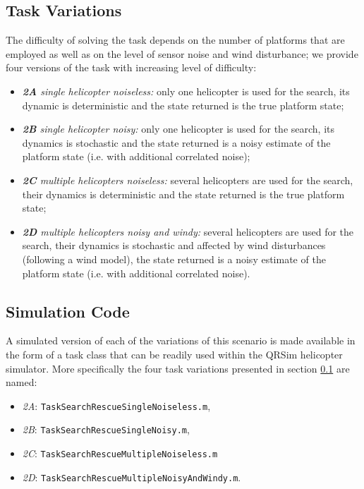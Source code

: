 \documentclass[a4paper,11pt]{report}
\newcommand{\sname}{QRSim\xspace}
\newcommand\mytexttt[1]{\texttt{\hyphenchar\font=45\relax #1}}
\begin{document}
\subsection{Task Variations} \label{SearchRescueVariations}
The difficulty of solving the task depends on the number of platforms that are employed as well as on the level of sensor noise and wind disturbance; we provide four versions of the task with increasing level of difficulty:
\begin{itemize}
 \item \textit{\textbf{2A} single helicopter noiseless:} only one helicopter is used for the search, its dynamic is deterministic and the state returned is the true platform state;
 \item \textit{\textbf{2B} single helicopter noisy:} only one helicopter is used for the search, its dynamics is stochastic and the state returned is a noisy estimate of the platform state (i.e. with additional correlated noise);
 \item \textit{\textbf{2C} multiple helicopters noiseless:} several helicopters are used for the search, their dynamics is deterministic and the state returned is the true platform state;
 \item \textit{\textbf{2D} multiple helicopters noisy and windy:} several helicopters are used for the search, their dynamics is stochastic and affected by wind disturbances (following a wind model), the state returned is a noisy estimate of the platform state (i.e. with additional correlated noise).
\end{itemize}

\subsection{Simulation Code} \label{SearchRescueSim}

A simulated version of each of the variations of this scenario is made available in the form of a task class that can be readily used within the \sname helicopter simulator. 
More specifically the four task variations presented in section \ref{SearchRescueVariations} are named:
\begin{itemize}
\item\textit{2A}: \mytexttt{TaskSearchRescueSingleNoiseless.m}, 
\item\textit{2B}: \mytexttt{TaskSearchRescueSingleNoisy.m}, 
\item\textit{2C}: \mytexttt{TaskSearchRescueMultipleNoiseless.m} 
\item\textit{2D}: \mytexttt{TaskSearchRescueMultipleNoisyAndWindy.m}. 
\end{itemize}
\end{document}
